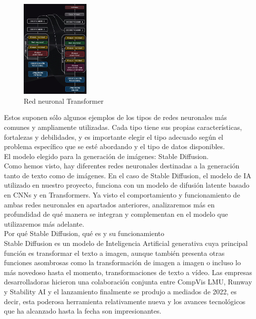 \begin{figure}[h]
	\centering
	\includegraphics[width = 0.3\textwidth]{Imagenes/Vectorial/transformer.png}
	\caption{Red neuronal Transformer}
	\label{fig:sampleImage}
\end{figure}

Estos suponen sólo algunos ejemplos de los tipos de redes neuronales más comunes y ampliamente utilizadas. Cada tipo tiene sus propias características, fortalezas y debilidades, y es importante elegir el tipo adecuado según el problema específico que se esté abordando y el tipo de datos disponibles.\\

El modelo elegido para la generación de imágenes: Stable Diffusion.\\

Como hemos visto, hay diferentes redes neuronales destinadas a la generación tanto de texto como de imágenes. En el caso de Stable Diffusion, el modelo de IA utilizado en nuestro proyecto, funciona con un modelo de difusión latente basado en CNNs y en Transformers. Ya visto el comportamiento y funcionamiento de ambas redes neuronales en apartados anteriores, analizaremos más en profundidad de qué manera se integran y complementan en el modelo que utilizaremos más adelante.\\


Por qué Stable Diffusion, qué es y su funcionamiento\\

Stable Diffusion es un modelo de Inteligencia Artificial generativa cuya principal función es transformar el texto a imagen, aunque también presenta otras funciones asombrosas como la transformación de imagen a imagen o incluso lo más novedoso hasta el momento, transformaciones de texto a vídeo. Las empresas desarrolladoras hicieron una colaboración conjunta entre CompVis LMU, Runway y Stability AI y el lanzamiento finalmente se produjo a mediados de 2022, es decir, esta poderosa herramienta relativamente nueva y los avances tecnológicos que ha alcanzado hasta la fecha son impresionantes. \\

